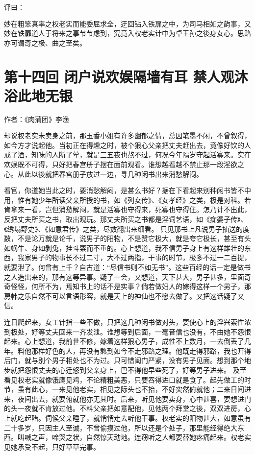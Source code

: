 \documentclass[a4paper,12pt,UTF8,twoside]{ctexbook}
\begin{document}
评曰：

妙在粗笨真率之权老实而能委屈求全，迂回钻入铁扉之中，为司马相如之韵事，又妙在铁扉道人于将来之事节节虑到，究竟入权老实计中为卓王孙之後身女心。思路亦可谓奇之极、曲之至矣。

\chapter{第十四回 闭户说欢娱隔墙有耳 禁人观沐浴此地无银}

作者：《肉蒲团》李渔

却说权老实未卖身之前，那玉香小姐有许多幽郁之情，总因笔墨不闲，不曾叙得，如今方才说起他。当初正在得趣之时，被个狠心父亲把丈夫赶出去，竟像好饮的人戒了酒，知味的人断了荤，就是三五夜也熬不过，何况今年隔岁守起活寡来。实在欢娱既不可得，只好把春宫册子摆在面前观看。谁想越看越不禁止那一段淫欲之心。从此以後就把春宫册子放过一边，寻几种闲书出来消愁解闷。

看官，你道她当此之时，要消愁解闷，是甚么书好？据在下看起来别种闲书皆不中用，惟有她少年所读父亲所授的书，如《列女传》、《女孝经》之类，极是对科。若肯拿来一看，岂但消愁解闷，就是活寡也守得来，死寡也守得住。怎乃计不出此，反把丈夫所买之书，取出观玩。那丈夫所买之书都是淫词艺语，如《痴婆子传》、《绣塌野史》、《如意君传》之类，尽数翻出来细看。 只见那书上凡说男子抽送的度数，不是论万就是论千，说男子的阳物，不是赞它极大，就是夸它极长，甚至有头如蜗牛、身如剥兔，挂斗粟而不垂的。心上想道，我不信男子身上有这样雄壮的东西，我家男子的物事长不过二寸，大不过两指，干事的时节，极多不过一二百提，就要泄了。何曾有上千？自古道：“尽信书则不如无书”。这些百经的话一定是做书之人造出来的，那有这等异事。疑了一会，又想道，天下甚大，男子甚多，里面奇奇怪怪，何所不为，焉知书上的话不是实事？倘若做妇人的嫁得这样一个男子，那房帏之乐自然不可以言语形容，就是天上的神仙也不愿去做了。又把这话疑了又信。

连日爬起来，女工针指一些不做，只把这几种闲书做对头，要使心上的淫兴索性浓到极处，好等丈夫回来一齐发泄。谁想等到后面，一毫音信也没有，不由她不怨恨起来。心上想道，我前世不修，嫁着这样狠心男子，成性不上数月，一去倒丢了几年。料他那样好色的人，再没有熬到如今不走邪路之理。他既走得邪路，我也开得后门，就与别个男子相处也不为过。只可惜闺门严紧，没有男子见面。想到那个地步就把怨恨丈夫的心迁怒到父亲身上，巴不得他早些死了，好等男子进来。 及至看见权老实就像饿鹰见鸡，不论精粗美恶，只要吞得进口就是食了。起先做工的时节，虽有此心，一来见他老实，相见之际头也不抬，不好突然俯就他；二来日间进来，夜间出去，就要俯就他亦无其时。后来，听见他要卖身，心中甚喜，要想进门的头一夜就不肯放过他。不料父亲把如意配他，见他两个拜堂之後，双双进房，心上就吃起醋。伺候父亲睡了，就悄悄走去听他干事。权老实的阳物甚大，如意虽有二十多岁，只因主人至诚，不曾偷摸过他，所以还是个处子，那里能经得绝大东西。叫喊之声，啼哭之状，自然惊天动地。连窃听之人都要替她疼痛起来。权老实见她承受不起，只好草草完事。
\end{document}
